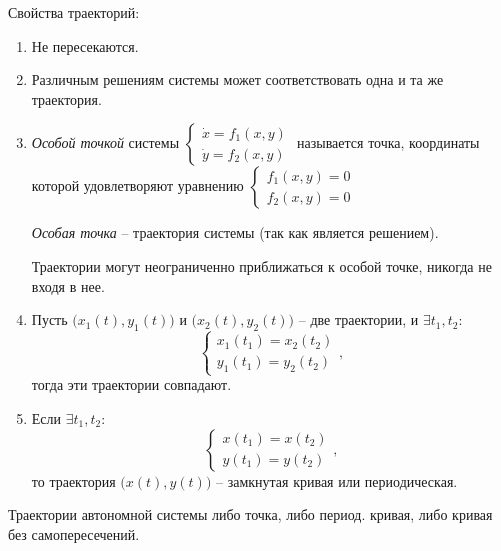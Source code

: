 Свойства траекторий:
\begin{enumerate}
	\item Не пересекаются.
	\item Различным решениям системы может соответствовать одна и та же траектория.
	\item \emph{Особой точкой} системы $\left\{\begin{array}{l}
			      \dot{x} = f_1(x,y) \\
			      \dot{y} = f_2(x,y)
		      \end{array}\right.$ называется точка, координаты которой удовлетворяют уравнению $\left\{\begin{array}{l}
			      f_1(x,y) = 0 \\
			      f_2(x,y) = 0
		      \end{array}\right.$

	      \emph{Особая точка} -- траектория системы (так как является решением).

	      \begin{remark}
		      Траектории могут неограниченно приближаться к особой точке, никогда не входя в нее.
	      \end{remark}

	\item Пусть $\big(x_1(t), y_1(t)\big)$ и $\big(x_2(t),y_2(t)\big)$ -- две траектории, и $\exists t_1,t_2$:
	      \[
		      \left\{\begin{array}{l}
			      x_1(t_1) = x_2(t_2) \\
			      y_1(t_1) = y_2(t_2)
		      \end{array}\right.,
	      \]
	      тогда эти траектории совпадают.

	\item Если $\exists t_1,t_2$:
	      \[
		      \left\{\begin{array}{l}
			      x(t_1) = x(t_2) \\
			      y(t_1) = y(t_2)
		      \end{array}\right.,
	      \]
	      то траектория $\big(x(t),y(t)\big)$ -- замкнутая кривая или периодическая.
\end{enumerate}

\begin{theorem}
	Траектории автономной системы либо точка, либо период. кривая, либо кривая без самопересечений.
\end{theorem}
